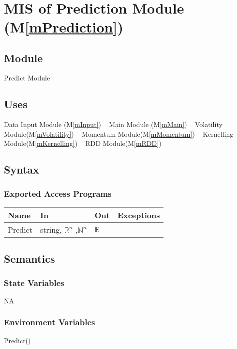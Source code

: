 \documentclass[12pt, titlepage]{article}
\newcommand{\mref}[1]{M\ref{#1}}
\begin{document}
~\newpage
\section{MIS of Prediction Module (\mref{mPrediction}) } 

\subsection{Module}
Predict Module
\subsection{Uses}
Data Input Module (\mref{mInput})
~\newline
Main Module (\mref{mMain})
~\newline
Volatility Module(\mref{mVolatility})
~\newline
Momentum Module(\mref{mMomentum})
~\newline
Kernelling Module(\mref{mKernelling})
~\newline
RDD Module(\mref{mRDD})

\subsection{Syntax}

\subsubsection{Exported Access Programs}

\begin{center}
\begin{tabular}{p{2cm} p{4cm} p{2cm} p{2cm}}
\hline
\textbf{Name} & \textbf{In} & \textbf{Out} & \textbf{Exceptions} \\
\hline

Predict & string, $\mathbb{R}^n$ ,$\mathbb{N}^n$ & $\mathbb{R}$ &- \\
\hline
\end{tabular}
\end{center}

\subsection{Semantics}
\subsubsection{State Variables}
NA
\subsubsection{Environment Variables}
Predict()
\end{document}
